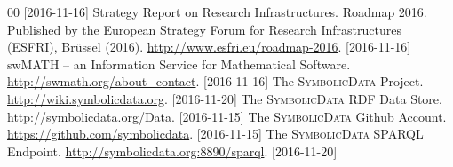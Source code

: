 \documentclass{mathincs}
\newcommand{\SD}{\textsc{Symbo\-lic\-Data}}
\begin{document}
\begin{thebibliography}{00}
      [2016-11-16]
 Strategy Report on Research Infrastructures.  Roadmap 2016.
  Published by the European Strategy Forum for Research Infrastructures
  (ESFRI), Br\"ussel (2016).  \url{http://www.esfri.eu/roadmap-2016}.
  [2016-11-16]
 swMATH -- an Information Service for Mathematical Software.
  \newblock \url{http://swmath.org/about_contact}. [2016-11-16]
 The {\SD} Project.  \url{http://wiki.symbolicdata.org}.
  [2016-11-20]
 The {\SD} RDF Data Store.
  \url{http://symbolicdata.org/Data}.  [2016-11-15] 
 The {\SD} Github Account.
  \url{https://github.com/symbolicdata}.  [2016-11-15]
 The {\SD} SPARQL Endpoint. 
   \url{http://symbolicdata.org:8890/sparql}. [2016-11-20]
\end{thebibliography}
\end{document}
